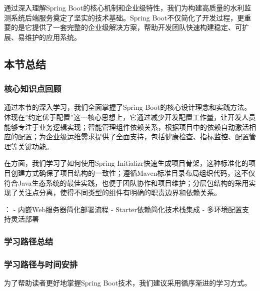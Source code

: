 通过深入理解Spring Boot的核心机制和企业级特性，我们为构建高质量的水利监测系统后端服务奠定了坚实的技术基础。Spring Boot不仅简化了开发过程，更重要的是它提供了一套完整的企业级解决方案，帮助开发团队快速构建稳定、可扩展、易维护的应用系统。

\hypertarget{ux672cux8282ux603bux7ed3-1}{%
\subsection{本节总结}\label{ux672cux8282ux603bux7ed3-1}}

\hypertarget{ux6838ux5fc3ux77e5ux8bc6ux70b9ux56deux987e-1}{%
\subsubsection{核心知识点回顾}\label{ux6838ux5fc3ux77e5ux8bc6ux70b9ux56deux987e-1}}

通过本节的深入学习，我们全面掌握了Spring Boot的核心设计理念和实践方法。体现在''约定优于配置''这一核心思想上，它通过减少开发配置工作量，让开发人员能够专注于业务逻辑实现；智能管理组件依赖关系，根据项目中的依赖自动激活相应的配置；为企业级运维需求提供了全面支持，包括健康检查、指标监控、配置管理等关键功能。

在方面，我们学习了如何使用Spring Initializr快速生成项目骨架，这种标准化的项目创建方式确保了项目结构的一致性；遵循Maven标准目录布局组织代码，这不仅符合Java生态系统的最佳实践，也便于团队协作和项目维护；分层包结构的采用实现了关注点分离，使得不同类型的组件有明确的职责边界和依赖关系。

： - 内嵌Web服务器简化部署流程 - Starter依赖简化技术栈集成 - 多环境配置支持灵活部署

\hypertarget{ux5b66ux4e60ux8defux5f84ux603bux7ed3}{%
\subsubsection{学习路径总结}\label{ux5b66ux4e60ux8defux5f84ux603bux7ed3}}

\hypertarget{ux5b66ux4e60ux8defux5f84ux4e0eux65f6ux95f4ux5b89ux6392}{%
\subsubsection{学习路径与时间安排}\label{ux5b66ux4e60ux8defux5f84ux4e0eux65f6ux95f4ux5b89ux6392}}

为了帮助读者更好地掌握Spring Boot技术，我们建议采用循序渐进的学习方式。

